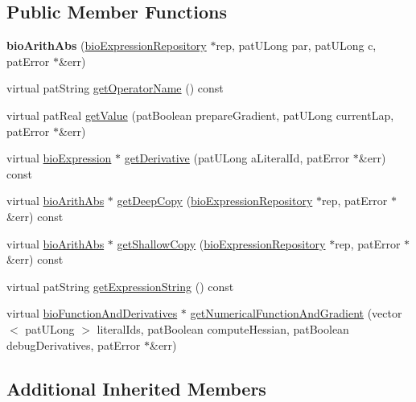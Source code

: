 \subsection*{Public Member Functions}
\begin{DoxyCompactItemize}
\item 
\mbox{\label{classbio_arith_abs_a8c92472b2d9e4abbb84894383e06513f}} 
{\bfseries bio\+Arith\+Abs} (\hyperlink{classbio_expression_repository}{bio\+Expression\+Repository} $\ast$rep, pat\+U\+Long par, pat\+U\+Long c, pat\+Error $\ast$\&err)
\item 
virtual pat\+String \hyperlink{classbio_arith_abs_ae3ec85c35e87b03dd5e4908e466252b3}{get\+Operator\+Name} () const
\item 
virtual pat\+Real \hyperlink{classbio_arith_abs_a4caa32d24495b1204a0ae99d0be72934}{get\+Value} (pat\+Boolean prepare\+Gradient, pat\+U\+Long current\+Lap, pat\+Error $\ast$\&err)
\item 
virtual \hyperlink{classbio_expression}{bio\+Expression} $\ast$ \hyperlink{classbio_arith_abs_a014621c263e720e52197b663f428e46d}{get\+Derivative} (pat\+U\+Long a\+Literal\+Id, pat\+Error $\ast$\&err) const
\item 
virtual \hyperlink{classbio_arith_abs}{bio\+Arith\+Abs} $\ast$ \hyperlink{classbio_arith_abs_a6b39360611c4dbb11ac38c501285c4b9}{get\+Deep\+Copy} (\hyperlink{classbio_expression_repository}{bio\+Expression\+Repository} $\ast$rep, pat\+Error $\ast$\&err) const
\item 
virtual \hyperlink{classbio_arith_abs}{bio\+Arith\+Abs} $\ast$ \hyperlink{classbio_arith_abs_a52b8f4ba02b450fa3b9624c8d791009e}{get\+Shallow\+Copy} (\hyperlink{classbio_expression_repository}{bio\+Expression\+Repository} $\ast$rep, pat\+Error $\ast$\&err) const
\item 
virtual pat\+String \hyperlink{classbio_arith_abs_a52f933907c3b7e246228297d1ac253ef}{get\+Expression\+String} () const
\item 
virtual \hyperlink{classbio_function_and_derivatives}{bio\+Function\+And\+Derivatives} $\ast$ \hyperlink{classbio_arith_abs_a3fada6c065ad722d23499284ad14dac4}{get\+Numerical\+Function\+And\+Gradient} (vector$<$ pat\+U\+Long $>$ literal\+Ids, pat\+Boolean compute\+Hessian, pat\+Boolean debug\+Derivatives, pat\+Error $\ast$\&err)
\end{DoxyCompactItemize}
\subsection*{Additional Inherited Members}


